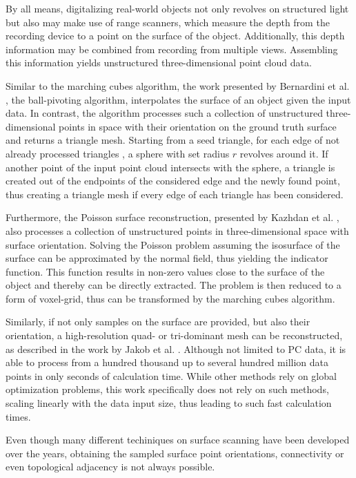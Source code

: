   By all means, digitalizing real-world objects not only revolves on structured light but also may make use of range scanners, which measure the depth from the recording device to a point on the surface of the object. Additionally, this depth information may be combined from recording from multiple views. Assembling this information yields unstructured three-dimensional point cloud data. 

  Similar to the marching cubes algorithm, the work presented by 
  Bernardini et al. \cite{817351}, the ball-pivoting algorithm, 
  interpolates the surface of an object given the input data.
  In contrast, the algorithm processes such a collection of unstructured 
  three-dimensional points in space with their orientation on the
  ground truth surface and returns a triangle mesh. Starting from
  a seed triangle, for each edge of not already processed triangles
  , a sphere with set radius $r$ revolves around it. If another point
  of the input point cloud intersects with the sphere, a triangle is 
  created out of the endpoints of the considered edge and the newly 
  found point, thus creating a triangle mesh if every edge of each 
  triangle has been considered. 
  

  Furthermore, the Poisson surface reconstruction, 
  presented by Kazhdan et al. \cite{Kazhdan:2006:PSR:1281957.1281965}, also processes a
  collection of unstructured points in three-dimensional
  space with surface orientation. Solving the Poisson problem 
  \cite{Genovese2006} assuming the isosurface of the surface can be 
  approximated by the normal field, thus yielding the
  indicator function. This function results in non-zero
  values close to the surface of the object and thereby 
  can be directly extracted. The problem is then reduced to a 
  form of voxel-grid, thus can be transformed by the marching
  cubes algorithm.

  Similarly, if not only samples on the surface are provided, 
  but also their orientation, a high-resolution quad- or 
  tri-dominant mesh can be reconstructed, as described in the 
  work by Jakob et al. \cite{}. Although not limited to PC data,
  it is able to process from a hundred thousand up to several
  hundred million data points in only seconds of calculation time.
  While other methods rely on global optimization problems, this work 
  specifically does not rely on such methods, scaling linearly with 
  the data input size, thus leading to such fast calculation times.

  Even though many different techiniques on surface scanning have been
  developed over the years, obtaining the sampled surface point orientations,
  connectivity or even topological adjacency is not always possible.

